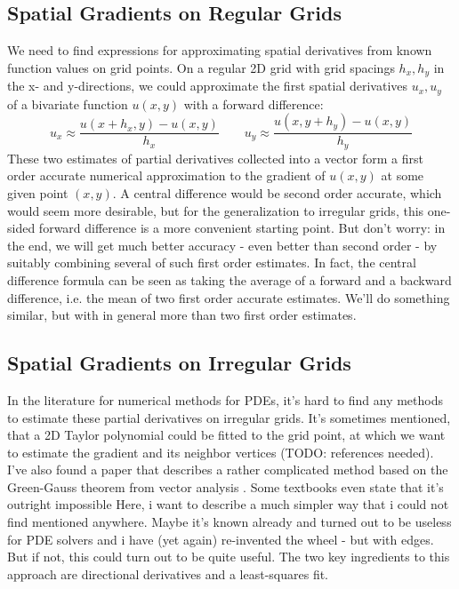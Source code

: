 \subsection{Spatial Gradients on Regular Grids}
We need to find expressions for approximating spatial derivatives from known function values on grid points. On a regular 2D grid with grid spacings $h_x, h_y$ in the x- and y-directions, we could approximate the first spatial derivatives $u_x,u_y$ of a bivariate function $u(x,y)$ with a forward difference:
\begin{equation}
  u_x \approx \frac{u(x+h_x,y) - u(x,y)} {h_x}  \qquad
  u_y \approx \frac{u(x,y+h_y) - u(x,y)} {h_y}
\end{equation}
These two estimates of partial derivatives collected into a vector form a first order accurate numerical approximation to the gradient of $u(x,y)$ at some given point $(x,y)$. A central difference would be second order accurate, which would seem more desirable, but for the generalization to irregular grids, this one-sided forward difference is a more convenient starting point. But don't worry: in the end, we will get much better accuracy - even better than second order - by suitably combining several of such first order estimates. In fact, the central difference formula can be seen as taking the average of a forward and a backward difference, i.e. the mean of two first order accurate estimates. We'll do something similar, but with in general more than two first order estimates.

\subsection{Spatial Gradients on Irregular Grids}
In the literature for numerical methods for PDEs, it's hard to find any methods to estimate these partial derivatives on irregular grids. It's sometimes mentioned, that a 2D Taylor polynomial could be fitted to the grid point, at which we want to estimate the gradient and its neighbor vertices (TODO: references needed). I've also found a paper that describes a rather complicated method based on the Green-Gauss theorem from vector analysis \cite{Xu}. Some textbooks even state that it's outright impossible \cite{Munz} Here, i want to describe a much simpler way that i could not find mentioned anywhere. Maybe it's known already and turned out to be useless for PDE solvers and i have (yet again) re-invented the wheel - but with edges. But if not, this could turn out to be quite useful. The two key ingredients to this approach are directional derivatives and a least-squares fit.

